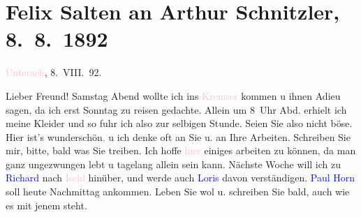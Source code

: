 

\renewcommand{\erwaehntePersonen}{Personen: Hermann Bahr, Richard Beer-Hofmann, Marie Glümer, Hugo von Hofmannsthal, Paul Horn, Gustav Schwarzkopf}
\renewcommand{\erwaehnteOrte}{Orte: Bad Ischl, Berghof, Café Kremser, Deutschland, Unterach am Attersee, Wien}
\renewcommand{\erwaehnteWerke}{}
\section[Felix Salten an Arthur Schnitzler, 8. 8. 1892]{Felix Salten an Arthur Schnitzler, 8. 8. 1892}
\nopagebreak{}
\rehead{ }\normalsize\beginnumbering{}
\toendnotes[C]{\smallbreak\pagebreak[2]}
\toendnotes[C]{\smallbreak}
\pstart
           \raggedleft{}{\pb}\textcolor{pink}{Unterach}{}\ledrightnote{\textcolor{pink}{Unterach am Attersee}}, 8. VIII. 92.\pend
           
\pstart
           Lieber Freund!{ }Samstag{ }Abend wollte ich ins \textcolor{pink}{Kremser}{}\ledrightnote{\textcolor{pink}{Café Kremser}} kommen u
               ihnen Adieu sagen, da ich erst Sonntag zu reisen
               gedachte. Allein um 8 Uhr Abd. erhielt ich meine Kleider und so fuhr ich
               also zur selbigen Stunde. Seien Sie also nicht böse. Hier ist’s
                  wunderschön\textcolor{gray}{,} u ich denke oft an Sie u. an Ihre Arbeiten.
               Schreiben Sie mir, bitte, bald was Sie treiben. {\pb}Ich hoffe \textcolor{pink}{hier}{}\ledrightnote{{$\rightarrow$}\textcolor{pink}{Unterach am Attersee}} einiges arbeiten zu können, da man ganz
               ungezwungen lebt u tagelang allein sein kann. Nächste Woche will ich zu \textcolor{blue}{Richard}{}\ledrightnote{\textcolor{blue}{Richard Beer-Hofmann}} nach \textcolor{pink}{Ischl}{}\ledrightnote{\textcolor{pink}{Bad Ischl}} hinüber, und werde auch \textcolor{blue}{Loris}{}\ledrightnote{\textcolor{blue}{Hugo von Hofmannsthal}}
               davon verständigen. \textcolor{blue}{Paul{ }{\pb}Horn}{}\ledrightnote{\textcolor{blue}{Paul Horn}} soll heute{ }Nachmittag ankommen. Leben Sie wol u. schreiben Sie bald, auch wie es
               mit jenem \label{K_L03111-1v}\label{K_L03111-1h} steht.\pend
           
